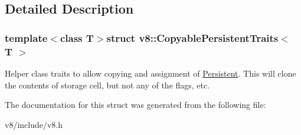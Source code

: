 \subsection{Detailed Description}
\subsubsection*{template$<$class T$>$struct v8\-::\-Copyable\-Persistent\-Traits$<$ T $>$}

Helper class traits to allow copying and assignment of \hyperlink{classv8_1_1Persistent}{Persistent}. This will clone the contents of storage cell, but not any of the flags, etc. 

The documentation for this struct was generated from the following file\-:\begin{DoxyCompactItemize}
\item 
v8/include/v8.\-h\end{DoxyCompactItemize}
